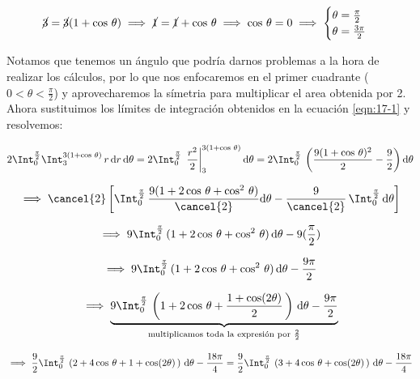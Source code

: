 \documentclass[12pt]{article}
\begin{document}
\begin{align*}
	\cancel{3} = \cancel{3}(1 + \cos\,\theta) \implies \cancel{1} = \cancel{1} + \cos\,\theta \implies \cos\,\theta = 0 \implies \begin{cases}
		\theta = \frac{\pi}{2} \\
		\theta = \frac{3\pi}{2}
	\end{cases}
\end{align*}

\noindent Notamos que tenemos un ángulo que podría darnos problemas a la hora de realizar los cálculos, por lo que nos enfocaremos en el primer cuadrante ($0<\theta<\frac{\pi}{2}$) y aprovecharemos la símetria para multiplicar el area obtenida por 2. Ahora sustituimos los límites de integración obtenidos en la ecuación \eqref{eqn:17-1} y resolvemos:

\begin{align*}
	2\Int_{0}^{\frac{\pi}{2}} \Int_{3}^{3(1+\cos\,\theta)}\, r\,\mathrm{d}r\,\mathrm{d}\theta = 2\Int_{0}^{\frac{\pi}{2}}\, \left.\frac{r^2}{2}\right|_{3}^{3(1+\cos\,\theta)} \mathrm{d}\theta = 2\Int_{0}^{\frac{\pi}{2}}\, \left(\frac{9(1+\cos\,\theta)^2}{2}  - \frac{9}{2}\right)  \mathrm{d}\theta
\end{align*}

\begin{align*}
	\implies \cancel{2}\left[ \Int_{0}^{\frac{\pi}{2}}\, \frac{9(1+2\cos\,\theta+\cos^2\,\theta)}{\cancel{2}} \mathrm{d}\theta  - \frac{9}{\cancel{2}}\, \Int_{0}^{\frac{\pi}{2}}\, \mathrm{d}\theta \right]
\end{align*}

\begin{align*}
	\implies 9\Int_{0}^{\frac{\pi}{2}}\, (1+2\cos\,\theta+\cos^2\,\theta)\, \mathrm{d}\theta  - 9 (\frac{\pi}{2})
\end{align*}

\begin{align*}
	\implies 9\Int_{0}^{\frac{\pi}{2}}\, (1+2\cos\,\theta+\cos^2\,\theta)\, \mathrm{d}\theta  - \frac{9\pi}{2}
\end{align*}

\begin{align*}
	\implies \underbrace{9\Int_{0}^{\frac{\pi}{2}}\, \left(1+2\cos\,\theta+\frac{1+\cos(2\theta)}{2}\,\right)\, \mathrm{d}\theta - \frac{9\pi}{2}}_{\text{multiplicamos toda la expresión por $\frac{2}{2}$}}
\end{align*}

\begin{align*}
	\implies \frac{9}{2}\Int_{0}^{\frac{\pi}{2}}\, \left(2+4\cos\,\theta+1+\cos(2\theta)\,\right)\, \mathrm{d}\theta - \frac{18\pi}{4} = \frac{9}{2}\Int_{0}^{\frac{\pi}{2}}\, \left(3+4\cos\,\theta+\cos(2\theta)\,\right)\, \mathrm{d}\theta - \frac{18\pi}{4}
\end{align*}
\end{document}
